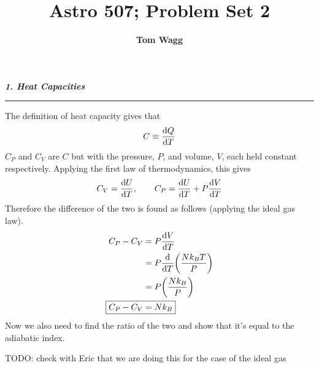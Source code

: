 \documentclass[12pt, letterpaper, twoside]{article}
\title{Astro 507; Problem Set 2}
\author{\textbf{Tom Wagg}}
\newcommand{\question}[1]{{\noindent \it #1}}
\newcommand{\answer}[1]{
    \par\noindent\rule{\textwidth}{0.4pt}#1\vspace{0.5cm}
}
\newcommand{\todo}[1]{{\color{red}\begin{center}TODO: #1\end{center}}}
\begin{document}
\maketitle

\question{\textbf{1. Heat Capacities}}
\answer{
    The definition of heat capacity gives that
    \begin{equation}
        C \equiv \dv{Q}{T}
    \end{equation}
    $C_P$ and $C_V$ are $C$ but with the pressure, $P$, and volume, $V$, each held constant respectively. Applying the first law of thermodynamics, this gives
    \begin{equation}
        C_V = \dv{U}{T},\qquad C_P = \dv{U}{T} + P \dv{V}{T}
    \end{equation}
    Therefore the difference of the two is found as follows (applying the ideal gas law).
    \begin{align}
        C_P - C_V &= P \dv{V}{T} \\
                  &= P \dv{T} \qty(\frac{N k_B T}{P}) \\
                  &= P \qty(\frac{N k_B}{P}) \\
        \Aboxed{ C_P - C_V &= N k_B }
    \end{align}
    Now we also need to find the ratio of the two and show that it's equal to the adiabatic index.
    \todo{check with Eric that we are doing this for the case of the ideal gas}
}

\pagebreak
\end{document}
